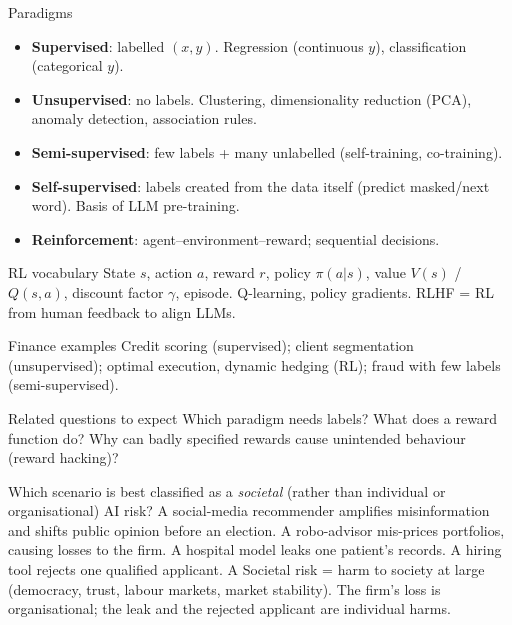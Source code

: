 {\begin{block}{Paradigms}
		\begin{itemize}
			\item \textbf{Supervised}: labelled $(x,y)$. Regression (continuous $y$), classification (categorical $y$).
			\item \textbf{Unsupervised}: no labels. Clustering, dimensionality reduction (PCA), anomaly detection, association rules.
			\item \textbf{Semi-supervised}: few labels + many unlabelled (self-training, co-training).
			\item \textbf{Self-supervised}: labels created from the data itself (predict masked/next word). Basis of LLM pre-training.
			\item \textbf{Reinforcement}: agent--environment--reward; sequential decisions.
\end{itemize}\end{block}}
{\begin{block}{RL vocabulary}
		State $s$, action $a$, reward $r$, policy $\pi(a|s)$, value $V(s)$ / $Q(s,a)$, discount factor $\gamma$, episode. Q-learning, policy gradients. RLHF = RL from human feedback to align LLMs.
	\end{block}
	\begin{block}{Finance examples}
		Credit scoring (supervised); client segmentation (unsupervised); optimal execution, dynamic hedging (RL); fraud with few labels (semi-supervised).
	\end{block}
	\begin{alertblock}{Related questions to expect}
		Which paradigm needs labels? What does a reward function do? Why can badly specified rewards cause unintended behaviour (reward hacking)?
\end{alertblock}}

{Which scenario is best classified as a \emph{societal} (rather than individual or organisational) AI risk?}
{A social-media recommender amplifies misinformation and shifts public opinion before an election.}
{A robo-advisor mis-prices portfolios, causing losses to the firm.}
{A hospital model leaks one patient's records.}
{A hiring tool rejects one qualified applicant.}
{A}
{Societal risk = harm to society at large (democracy, trust, labour markets, market stability). The firm's loss is organisational; the leak and the rejected applicant are individual harms.}

